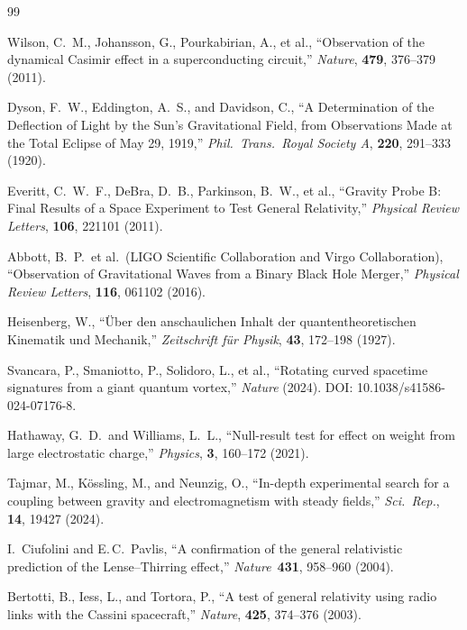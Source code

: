 ﻿\documentclass[12pt,letterpaper]{article}
\begin{document}
\begin{thebibliography}{99}

Wilson, C.~M., Johansson, G., Pourkabirian, A., et al.,
``Observation of the dynamical Casimir effect in a superconducting circuit,''
\textit{Nature}, \textbf{479}, 376--379 (2011).



Dyson, F.~W., Eddington, A.~S., and Davidson, C.,
``A Determination of the Deflection of Light by the Sun's Gravitational Field, from Observations Made at the Total Eclipse of May 29, 1919,''
\textit{Phil.\ Trans.\ Royal Society A}, \textbf{220}, 291--333 (1920).


Everitt, C.~W.~F., DeBra, D.~B., Parkinson, B.~W., et al.,
``Gravity Probe B: Final Results of a Space Experiment to Test General Relativity,''
\textit{Physical Review Letters}, \textbf{106}, 221101 (2011).


Abbott, B.~P.\ et al.\ (LIGO Scientific Collaboration and Virgo Collaboration),
``Observation of Gravitational Waves from a Binary Black Hole Merger,''
\textit{Physical Review Letters}, \textbf{116}, 061102 (2016).


Heisenberg, W.,
``\"{U}ber den anschaulichen Inhalt der quantentheoretischen Kinematik und Mechanik,''
\textit{Zeitschrift f\"{u}r Physik}, \textbf{43}, 172--198 (1927).


Svancara, P., Smaniotto, P., Solidoro, L., et al.,
``Rotating curved spacetime signatures from a giant quantum vortex,''
\textit{Nature} (2024). DOI: 10.1038/s41586-024-07176-8.


Hathaway, G.~D.\ and Williams, L.~L.,
``Null-result test for effect on weight from large electrostatic charge,''
\textit{Physics}, \textbf{3}, 160--172 (2021).


Tajmar, M., K\"ossling, M., and Neunzig, O.,
``In-depth experimental search for a coupling between gravity and electromagnetism with steady fields,''
\textit{Sci.\ Rep.}, \textbf{14}, 19427 (2024).



I.~Ciufolini and E.\,C.~Pavlis,
``A confirmation of the general relativistic prediction of the
Lense--Thirring effect,''
\emph{Nature}\ \textbf{431}, 958--960 (2004).



Bertotti, B., Iess, L., and Tortora, P.,
``A test of general relativity using radio links with the Cassini spacecraft,''
\textit{Nature}, \textbf{425}, 374--376 (2003).


\end{thebibliography}
\end{document}
